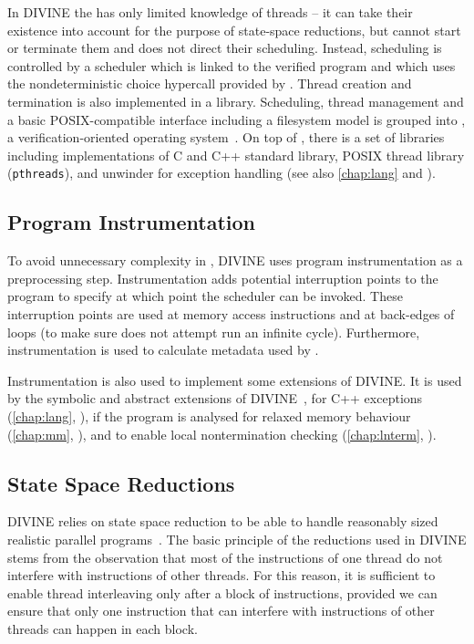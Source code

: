 In DIVINE the \divm has only limited knowledge of threads -- it can take their
existence into account for the purpose of state-space reductions, but cannot
start or terminate them and does not direct their scheduling.
Instead, scheduling is controlled by a scheduler which is linked to the
verified program and which uses the nondeterministic choice hypercall provided
by \divm.
Thread creation and termination is also implemented in a library.
Scheduling, thread management and a basic POSIX-compatible interface including
a filesystem model is grouped into \dios, a verification-oriented operating
system~.
On top of \dios, there is a set of libraries including implementations of C and C++ standard library, POSIX thread library (\texttt{pthreads}), and unwinder for exception handling (see also \autoref{chap:lang} and ).

\subsection{Program Instrumentation}

To avoid unnecessary complexity in \divm, DIVINE uses program instrumentation
as a preprocessing step.
Instrumentation adds potential interruption points to the program to specify at
which point the scheduler can be invoked.
These interruption points are used at memory access instructions and at
back-edges of loops (to make sure \divm does not attempt run an infinite
cycle).
Furthermore, instrumentation is used to calculate metadata used by \dios.

Instrumentation is also used to implement some extensions of DIVINE.
It is used by the symbolic and abstract extensions of
DIVINE~, for C++ exceptions (\autoref{chap:lang},
), if the program is analysed for relaxed memory behaviour
(\autoref{chap:mm}, ), and to enable local nontermination
checking (\autoref{chap:lnterm}, ).

\subsection{State Space Reductions}

DIVINE relies on state space reduction to be able to handle reasonably sized
realistic parallel programs~.
The basic principle of the reductions used in DIVINE stems from the observation
that most of the instructions of one thread do not interfere with instructions
of other threads.
For this reason, it is sufficient to enable thread interleaving only after a
block of instructions, provided we can ensure that only one instruction that
can interfere with instructions of other threads can happen in each block.

